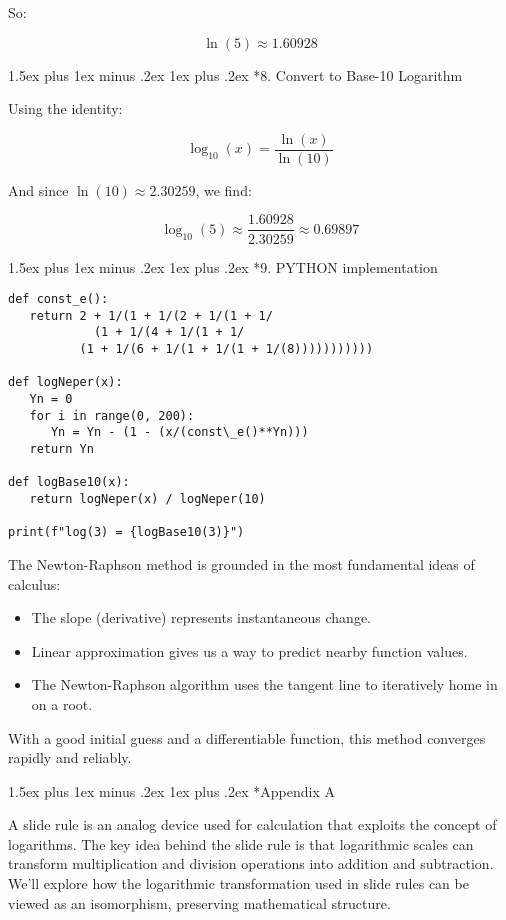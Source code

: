 \documentclass[10pt,twocolumn]{article}
\makeatletter
\renewcommand\section{%
  \@startsection{section}{1}{0pt}%
  {1.5ex plus 1ex minus .2ex}%
  {1ex plus .2ex}%
  {\normalfont\normalsize\bfseries}} %
\makeatother
\begin{document}
So:

\[
\ln(5) \approx 1.60928
\]

\section*{8. Convert to Base-10 Logarithm}

Using the identity:

\[
\log_{10}(x) = \frac{\ln(x)}{\ln(10)}
\]

And since \( \ln(10) \approx 2.30259 \), we find:

\[
\log_{10}(5) \approx \frac{1.60928}{2.30259} \approx 0.69897
\]

\section*{9. PYTHON implementation}

\small
\begin{verbatim}
def const_e():
   return 2 + 1/(1 + 1/(2 + 1/(1 + 1/
	        (1 + 1/(4 + 1/(1 + 1/
          (1 + 1/(6 + 1/(1 + 1/(1 + 1/(8)))))))))))

def logNeper(x):
   Yn = 0
   for i in range(0, 200):
      Yn = Yn - (1 - (x/(const\_e()**Yn)))
   return Yn

def logBase10(x):
   return logNeper(x) / logNeper(10)

print(f"log(3) = {logBase10(3)}")
\end{verbatim}

The Newton-Raphson method is grounded in the most fundamental ideas of calculus:

\begin{itemize}
    \item The slope (derivative) represents instantaneous change.
    \item Linear approximation gives us a way to predict nearby function values.
    \item The Newton-Raphson algorithm uses the tangent line to iteratively home in on a root.
\end{itemize}

With a good initial guess and a differentiable function, this method converges rapidly and reliably.

\section*{Appendix A}

A slide rule is an analog device used for calculation that exploits the concept of logarithms. The key idea behind the slide rule is that logarithmic scales can transform multiplication and division operations into addition and subtraction. We'll explore how the logarithmic transformation used in slide rules can be viewed as an isomorphism, preserving mathematical structure.
\end{document}
